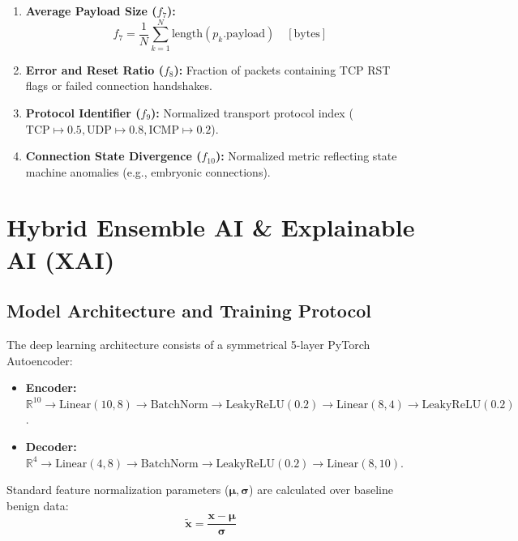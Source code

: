 \documentclass[12pt,a4paper]{report}
\begin{document}
\begin{enumerate}
    \begin{equation}
        f_6 = -\sum_{j \in \text{Ports}} P(j) \log_2 P(j)
    \end{equation}
    where $P(j)$ is the empirical probability of targeting port $j$.
    \item \textbf{Average Payload Size ($f_7$):}
    \begin{equation}
        f_7 = \frac{1}{N} \sum_{k=1}^N \text{length}(p_k.\text{payload}) \quad [\text{bytes}]
    \end{equation}
    \item \textbf{Error and Reset Ratio ($f_8$):} Fraction of packets containing TCP RST flags or failed connection handshakes.
    \item \textbf{Protocol Identifier ($f_9$):} Normalized transport protocol index ($\text{TCP} \mapsto 0.5, \text{UDP} \mapsto 0.8, \text{ICMP} \mapsto 0.2$).
    \item \textbf{Connection State Divergence ($f_{10}$):} Normalized metric reflecting state machine anomalies (e.g., embryonic connections).
\end{enumerate}

\chapter{Hybrid Ensemble AI \& Explainable AI (XAI)}

\section{Model Architecture and Training Protocol}
The deep learning architecture consists of a symmetrical 5-layer PyTorch Autoencoder:
\begin{itemize}
    \item \textbf{Encoder:} $\mathbb{R}^{10} \to \text{Linear}(10, 8) \to \text{BatchNorm} \to \text{LeakyReLU}(0.2) \to \text{Linear}(8, 4) \to \text{LeakyReLU}(0.2)$.
    \item \textbf{Decoder:} $\mathbb{R}^{4} \to \text{Linear}(4, 8) \to \text{BatchNorm} \to \text{LeakyReLU}(0.2) \to \text{Linear}(8, 10)$.
\end{itemize}

Standard feature normalization parameters ($\boldsymbol{\mu}, \boldsymbol{\sigma}$) are calculated over baseline benign data:
\begin{equation}
    \tilde{\mathbf{x}} = \frac{\mathbf{x} - \boldsymbol{\mu}}{\boldsymbol{\sigma}}
\end{equation}
\end{document}
